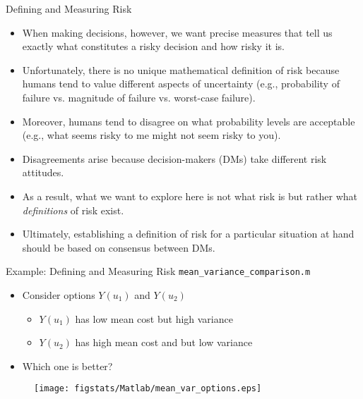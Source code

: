 \documentclass[9pt]{beamer}
\begin{document}
%
\begin{frame}{Defining and Measuring Risk}

\begin{itemize}
   \setlength{\itemsep}{10pt}
\item When making decisions, however, we want precise measures that tell us exactly what constitutes a risky decision and how risky it is. 

\item Unfortunately, there is no unique mathematical definition of risk because humans tend to value different aspects of  uncertainty (e.g., probability of failure vs. magnitude of failure vs. worst-case failure).  

\item Moreover, humans tend to disagree on what probability levels are acceptable (e.g., what seems risky to me might not seem risky to you).

\item Disagreements arise because decision-makers (DMs) take different risk attitudes. 

\item As a result, what we want to explore here is not what risk is but rather what {\em definitions} of risk exist. 

\item Ultimately, establishing a definition of risk for a particular situation at hand should be based on consensus between DMs. 

\end{itemize}

\end{frame}

%
\begin{frame}{Example: Defining and Measuring Risk \footnotesize{\texttt{mean\_variance\_comparison.m}}}
\begin{itemize}
   \setlength{\itemsep}{10pt}
\item Consider options $Y(u_1)$ and $Y(u_2)$  
\begin{itemize}
   \setlength{\itemsep}{10pt}
\item $Y(u_1)$ has low mean cost but high variance 
\item $Y(u_2)$ has high mean cost and but low variance
\end{itemize}
\item Which one is better?
\end{itemize}
\begin{figure}[!htb]
    \centering
	\texttt{[image: figstats/Matlab/mean\_var\_options.eps]}
\end{figure}

\end{frame}
\end{document}
